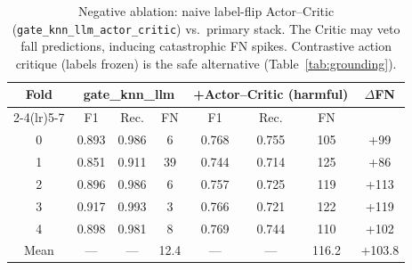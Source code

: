 \begin{table}[!t]
\centering
\caption{Negative ablation: naive label-flip Actor--Critic (\texttt{gate\_knn\_llm\_actor\_critic}) vs.\ primary stack. The Critic may veto fall predictions, inducing catastrophic FN spikes. Contrastive action critique (labels frozen) is the safe alternative (Table~\ref{tab:grounding}).}
\label{tab:negative}
\begin{tabular}{c ccc ccc c}
\toprule
Fold & \multicolumn{3}{c}{gate\_knn\_llm} & \multicolumn{3}{c}{+Actor--Critic (harmful)} & $\Delta$FN \\
\cmidrule(lr){2-4}\cmidrule(lr){5-7}
 & F1 & Rec. & FN & F1 & Rec. & FN & \\
\midrule
0 & 0.893 & 0.986 & 6 & 0.768 & 0.755 & 105 & +99 \\
1 & 0.851 & 0.911 & 39 & 0.744 & 0.714 & 125 & +86 \\
2 & 0.896 & 0.986 & 6 & 0.757 & 0.725 & 119 & +113 \\
3 & 0.917 & 0.993 & 3 & 0.766 & 0.721 & 122 & +119 \\
4 & 0.898 & 0.981 & 8 & 0.769 & 0.744 & 110 & +102 \\
\midrule
Mean & --- & --- & 12.4 & --- & --- & 116.2 & +103.8 \\
\bottomrule
\end{tabular}
\end{table}
